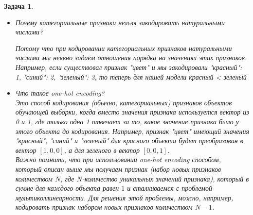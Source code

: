 \documentclass[a4paper,12pt]{article}
\theoremstyle{mystyle}
\newtheorem{esProblem}{Задача}
\begin{document}
\begin{esProblem}
\begin{itemize}
        Кросс-валидация - это метод оценки качества модели, при котором: \\
        1. Данные разбиваются на $k$ частей \\
        2. Модель обучается $k$ раз на $(k-1)$ части и тестируется на оставшейся \\
        3. Полученные оценки качества и метрики усредняются 
        
        Плюсы такого подхода в сравнении с использованием отложенной выборки: \\

        + Более надежная оценка качества: \\
        Каждое наблюдение участвует в тестировании, а результат меньше зависит от конкретного разбиения данных. Таким образом можно получить не только средние оценки, но и оценить их дисперсию. \\

        + Эффективное использование данных: \\
        Все наблюдения участвуют в обучении, что особенно важно при малых выборках \\

        + Помогает выявлять нестабильность модели: \\
        Если качество сильно варьируется между фолдами, это может говорить о проблемах с моделью. Можно обнаружить чувствительность к выбросам.
        
        \item Почему категориальные признаки нельзя закодировать натуральными числами? 
        
        Потому что при кодировании категориальных признаков натуральными числами мы неявно задаем отношения порядка на значениях этих признаков. Например, если существовал признак "цвет" и мы закодировали "красный": 1, "синий": 2, "зеленый": 3, то теперь для нашей модели красный < зеленый
        
        \item Что такое one-hot encoding? \\
        Это способ кодирования (обычно, категориальных) признаков объектов обучающей выборки, когда вместо значения признака используется вектор из 0 и 1, где только одна 1 отвечает за то, какое значение признака было у этого объекта до кодирования. Например, признак "цвет" имеющий значения "красный", "синий" и "зеленый" для красного объекта будет преобразован в вектор $[1, 0, 0]$, а для зеленого в вектор $[0, 0, 1]$. \\
        Важно помнить, что при использовании one-hot encoding способом, который описан выше мы получаем признак (набор новых признаков количеством $N$, где $N$-количество уникальных значений признака), который в сумме для каждого объекта равен $1$ и сталкиваемся с проблемой мультиколлинеарности. Для решения этой проблемы, можно, например, кодировать признак набором новых признаков количеством $N-1$.
        

\end{itemize}
\end{esProblem}
\end{document}
